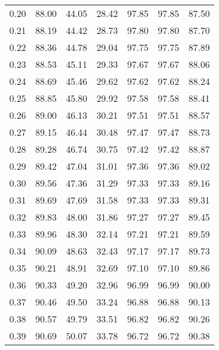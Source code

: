 \begin{tabular}{|c|c|c|c|c|c|c|}
      0.20 &     88.00 &     44.05 &      28.42 &   97.85 &      97.85 &         87.50 \\
      0.21 &     88.19 &     44.42 &      28.73 &   97.80 &      97.80 &         87.70 \\
      0.22 &     88.36 &     44.78 &      29.04 &   97.75 &      97.75 &         87.89 \\
      0.23 &     88.53 &     45.11 &      29.33 &   97.67 &      97.67 &         88.06 \\
      0.24 &     88.69 &     45.46 &      29.62 &   97.62 &      97.62 &         88.24 \\
      0.25 &     88.85 &     45.80 &      29.92 &   97.58 &      97.58 &         88.41 \\
      0.26 &     89.00 &     46.13 &      30.21 &   97.51 &      97.51 &         88.57 \\
      0.27 &     89.15 &     46.44 &      30.48 &   97.47 &      97.47 &         88.73 \\
      0.28 &     89.28 &     46.74 &      30.75 &   97.42 &      97.42 &         88.87 \\
      0.29 &     89.42 &     47.04 &      31.01 &   97.36 &      97.36 &         89.02 \\
      0.30 &     89.56 &     47.36 &      31.29 &   97.33 &      97.33 &         89.16 \\
      0.31 &     89.69 &     47.69 &      31.58 &   97.33 &      97.33 &         89.31 \\
      0.32 &     89.83 &     48.00 &      31.86 &   97.27 &      97.27 &         89.45 \\
      0.33 &     89.96 &     48.30 &      32.14 &   97.21 &      97.21 &         89.59 \\
      0.34 &     90.09 &     48.63 &      32.43 &   97.17 &      97.17 &         89.73 \\
      0.35 &     90.21 &     48.91 &      32.69 &   97.10 &      97.10 &         89.86 \\
      0.36 &     90.33 &     49.20 &      32.96 &   96.99 &      96.99 &         90.00 \\
      0.37 &     90.46 &     49.50 &      33.24 &   96.88 &      96.88 &         90.13 \\
      0.38 &     90.57 &     49.79 &      33.51 &   96.82 &      96.82 &         90.26 \\
      0.39 &     90.69 &     50.07 &      33.78 &   96.72 &      96.72 &         90.38 \\

\end{tabular}
